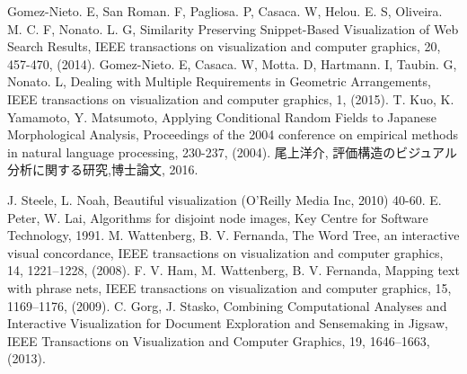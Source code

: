 \documentclass[syuuron]{kuee}
\begin{document}
\begin{thebibliography}{数字}
	 Gomez-Nieto. E, San Roman. F, Pagliosa. P, Casaca. W, Helou. E. S, Oliveira. M. C. F, Nonato. L. G, Similarity Preserving Snippet-Based Visualization of Web Search Results, IEEE transactions on visualization and computer graphics, 20, 457-470, (2014).
	 Gomez-Nieto. E, Casaca. W, Motta. D, Hartmann. I, Taubin. G, Nonato. L, Dealing with Multiple Requirements in Geometric Arrangements, IEEE transactions on visualization and computer graphics, 1, (2015).
	 T. Kuo, K. Yamamoto, Y. Matsumoto, Applying Conditional Random Fields to Japanese Morphological Analysis, Proceedings of the 2004 conference on empirical methods in natural language processing, 230-237, (2004).
	 尾上洋介, 評価構造のビジュアル分析に関する研究,博士論文, 2016.
	
	 J. Steele, L. Noah, Beautiful visualization (O'Reilly Media Inc, 2010) 40-60.
	 E. Peter, W. Lai, Algorithms for disjoint node images, Key Centre for Software Technology, 1991.
	 M. Wattenberg, B. V. Fernanda, The Word Tree, an interactive visual concordance, IEEE transactions on visualization and computer graphics, 14, 1221–1228, (2008).
	 F. V. Ham, M. Wattenberg, B. V. Fernanda, Mapping text with phrase nets, IEEE transactions on visualization and computer graphics, 15, 1169–1176, (2009).
	 C. Gorg, J. Stasko, Combining Computational Analyses and Interactive Visualization for Document Exploration and Sensemaking in Jigsaw, IEEE Transactions on Visualization and Computer Graphics, 19, 1646–1663, (2013).
\end{thebibliography}

\appendix
\end{document}
